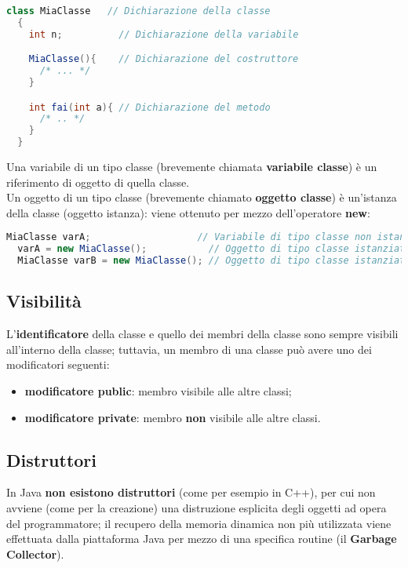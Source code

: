 \documentclass[a4paper]{extarticle}
\begin{document}
\vspace{1em}
\noindent
\begin{lstlisting}[language=Java, caption=Esempio di classe Java]
  class MiaClasse   // Dichiarazione della classe
  {
    int n;          // Dichiarazione della variabile

    MiaClasse(){    // Dichiarazione del costruttore
      /* ... */
    }

    int fai(int a){ // Dichiarazione del metodo
      /* .. */
    }
  }
\end{lstlisting}

\vspace{1em}
\noindent
Una variabile di un tipo classe (brevemente chiamata \textbf{variabile classe}) è un riferimento di oggetto di quella classe.\\
Un oggetto di un tipo classe (brevemente chiamato \textbf{oggetto classe}) è un’istanza della classe (oggetto istanza): viene ottenuto per mezzo dell’operatore \textbf{new}:

\vspace{1em}
\noindent
\begin{lstlisting}[language=Java, caption=Esempio variabile e oggetto di classe Java]
  MiaClasse varA;                   // Variabile di tipo classe non istanziata
  varA = new MiaClasse();           // Oggetto di tipo classe istanziato
  MiaClasse varB = new MiaClasse(); // Oggetto di tipo classe istanziato
\end{lstlisting}

\vspace{1em}
\subsection{Visibilità}
L’\textbf{identificatore} della classe e quello dei membri della classe sono sempre visibili all’interno della classe; tuttavia, un membro di una classe può avere uno dei modificatori seguenti:
\begin{itemize}
  \item \textbf{modificatore public}: membro visibile alle altre classi;
  \item \textbf{modificatore private}: membro \textbf{non} visibile alle altre classi.
\end{itemize}

\vspace{1em}
\subsection{Distruttori}
In Java \textbf{non esistono distruttori} (come per esempio in C++), per cui non avviene (come per la creazione) una distruzione esplicita degli oggetti ad opera del programmatore; il recupero della memoria dinamica non più utilizzata viene effettuata dalla piattaforma Java per mezzo di una specifica routine (il \textbf{Garbage Collector}).
\end{document}
